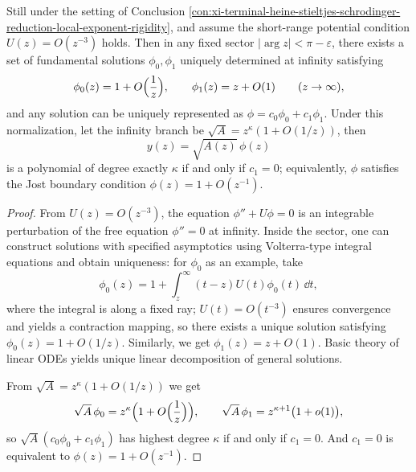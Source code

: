 \begin{conclusion}\label{con:xi-terminal-heine-stieltjes-zero-energy-scattering-jost-normalization}
Still under the setting of Conclusion \ref{con:xi-terminal-heine-stieltjes-schrodinger-reduction-local-exponent-rigidity}, and assume the short-range potential condition \(U(z)=O(z^{-3})\) holds.
Then in any fixed sector \(|\arg z|<\pi-\varepsilon\), there exists a set of fundamental solutions \(\phi_{0},\phi_{1}\) uniquely determined at infinity satisfying
\[
\phi_{0}(z)=1+O\Bigl(\frac{1}{z}\Bigr),
\qquad
\phi_{1}(z)=z+O(1)
\qquad(z\to\infty),
\]
and any solution can be uniquely represented as \(\phi=c_{0}\phi_{0}+c_{1}\phi_{1}\).
Under this normalization, let the infinity branch be \(\sqrt A=z^{\kappa}(1+O(1/z))\), then
\[
y(z)=\sqrt{A(z)}\,\phi(z)
\]
is a polynomial of degree exactly \(\kappa\) if and only if \(c_{1}=0\); equivalently, \(\phi\) satisfies the Jost boundary condition \(\phi(z)=1+O(z^{-1})\).
\end{conclusion}
\begin{proof}
From \(U(z)=O(z^{-3})\), the equation \(\phi''+U\phi=0\) is an integrable perturbation of the free equation \(\phi''=0\) at infinity.
Inside the sector, one can construct solutions with specified asymptotics using Volterra-type integral equations and obtain uniqueness: for \(\phi_{0}\) as an example, take
\[
\phi_{0}(z)=1+\int_{z}^{\infty}(t-z)U(t)\phi_{0}(t)\,\dd t,
\]
where the integral is along a fixed ray; \(U(t)=O(t^{-3})\) ensures convergence and yields a contraction mapping, so there exists a unique solution satisfying \(\phi_{0}(z)=1+O(1/z)\).
Similarly, we get \(\phi_{1}(z)=z+O(1)\).
Basic theory of linear ODEs yields unique linear decomposition of general solutions.
\par
From \(\sqrt A=z^{\kappa}(1+O(1/z))\) we get
\[
\sqrt A\,\phi_{0}=z^{\kappa}\Bigl(1+O\Bigl(\frac{1}{z}\Bigr)\Bigr),
\qquad
\sqrt A\,\phi_{1}=z^{\kappa+1}\bigl(1+o(1)\bigr),
\]
so \(\sqrt A(c_{0}\phi_{0}+c_{1}\phi_{1})\) has highest degree \(\kappa\) if and only if \(c_{1}=0\).
And \(c_{1}=0\) is equivalent to \(\phi(z)=1+O(z^{-1})\).
\end{proof}

